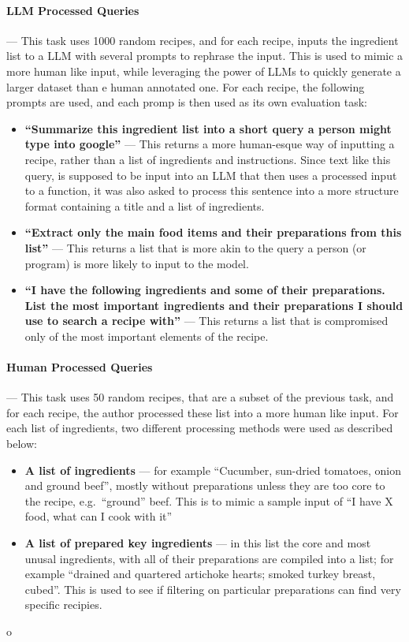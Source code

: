 \documentclass[11pt]{article}
\begin{document}
\paragraph{LLM Processed Queries} --- This task uses 1000 random
recipes, and for each recipe, inputs the ingredient list to a LLM with several
prompts to rephrase the input.
This is used to mimic a more human like input, while leveraging the power of
LLMs to quickly generate a larger dataset than e human annotated one.
For each recipe, the following prompts are used, and each promp is then used as
its own evaluation task:
\begin{itemize}
    \item \textbf{``Summarize this ingredient list into a short query a person might type
        into google''} --- This returns a more human-esque way of inputting a
        recipe, rather than a list of ingredients and instructions.
        Since text like this query, is supposed to be input into an LLM that
        then uses a processed input to a function, it was also asked to process
        this sentence into a more structure format containing a title and a list
        of ingredients.
    \item \textbf{``Extract only the main food items and their preparations from
        this list''} --- This returns a list that is more akin to the query a
        person (or program) is more likely to input to the model.
    \item \textbf{``I have the following ingredients and some of their
            preparations. List the most important ingredients and their
        preparations I should use to search a recipe with''} --- This returns a
        list that is compromised only of the most important elements of the
        recipe.
\end{itemize}

\paragraph{Human Processed Queries} --- This task uses 50 random recipes, that
are a subset of the previous task, and for each recipe, the author processed
these list into a more human like input.
For each list of ingredients, two different processing methods were used as
described below:
\begin{itemize}
    \item \textbf{A list of ingredients} --- for example ``Cucumber,
        sun-dried tomatoes, onion and ground beef'', mostly without preparations
        unless they are too core to the recipe, e.g.\ ``ground'' beef.
        This is to mimic a sample input of ``I have X food, what can I cook with it''
    \item \textbf{A list of prepared key ingredients} --- in this list the core
        and most unusal ingredients, with all of their preparations are compiled
        into a list; for example ``drained
        and quartered artichoke hearts; smoked turkey breast, cubed''.
        This is used to see if filtering on particular preparations can find
        very specific recipies.
\end{itemize}o
\end{document}
